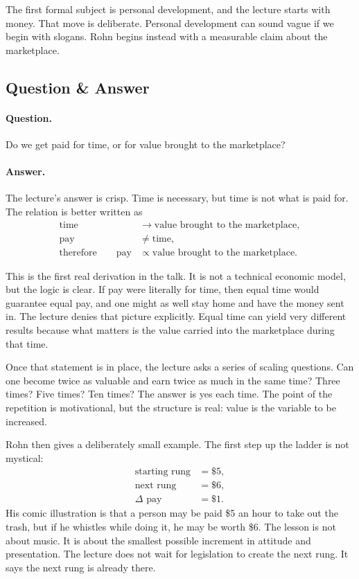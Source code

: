 The first formal subject is personal development, and the lecture starts with money. That move is deliberate. Personal development can sound vague if we begin with slogans. Rohn begins instead with a measurable claim about the marketplace.

\subsection{Question \& Answer}

\paragraph{Question.} Do we get paid for time, or for value brought to the marketplace?

\paragraph{Answer.} The lecture's answer is crisp. Time is necessary, but time is not what is paid for. The relation is better written as
\begin{align}
\text{time} &\longrightarrow \text{value brought to the marketplace},\\
\text{pay} &\neq \text{time},\\
\text{therefore}\qquad \text{pay} &\propto \text{value brought to the marketplace}.
\end{align}

This is the first real derivation in the talk. It is not a technical economic model, but the logic is clear. If pay were literally for time, then equal time would guarantee equal pay, and one might as well stay home and have the money sent in. The lecture denies that picture explicitly. Equal time can yield very different results because what matters is the value carried into the marketplace during that time.

Once that statement is in place, the lecture asks a series of scaling questions. Can one become twice as valuable and earn twice as much in the same time? Three times? Five times? Ten times? The answer is yes each time. The point of the repetition is motivational, but the structure is real: value is the variable to be increased.

Rohn then gives a deliberately small example. The first step up the ladder is not mystical:
\begin{align}
\text{starting rung} &= \$5,\\
\text{next rung} &= \$6,\\
\Delta \text{ pay} &= \$1.
\end{align}
His comic illustration is that a person may be paid \$5 an hour to take out the trash, but if he whistles while doing it, he may be worth \$6. The lesson is not about music. It is about the smallest possible increment in attitude and presentation. The lecture does not wait for legislation to create the next rung. It says the next rung is already there.

